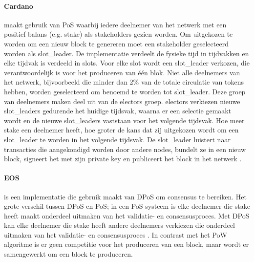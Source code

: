 \paragraph{Cardano} maakt gebruik van \acrshort{PoS} waarbij iedere deelnemer van het netwerk met een positief balans (e.g. stake) als stakeholders gezien worden. Om uitgekozen te worden om een nieuw block te genereren moet een stakeholder geselecteerd worden als \gls{slot_leader}. De implementatie verdeelt de fysieke tijd in tijdvakken en elke tijdvak is verdeeld in slots. Voor elke slot wordt een \gls{slot_leader} verkozen, die verantwoordelijk is voor het produceren van één blok. Niet alle deelnemers van het netwerk, bijvoorbeeld die minder dan 2\% van de totale circulatie van \glspl{token} hebben, worden geselecteerd om benoemd te worden tot \gls{slot_leader}. Deze groep van deelnemers maken deel uit van de \glspl{elector} groep. \Glspl{elector} verkiezen nieuwe \glspl{slot_leader} gedurende het huidige tijdsvak, waarna er een selectie gemaakt wordt en de nieuwe \glspl{slot_leader} vaststaan voor het volgende tijdsvak. Hoe meer \gls{stake} een deelnemer heeft, hoe groter de kans dat zij uitgekozen wordt om een \gls{slot_leader} te worden in het volgende tijdsvak. De \gls{slot_leader} luistert naar transacties die aangekondigd worden door andere nodes, bundelt ze in een nieuw block, signeert het met zijn private key en publiceert het block in het netwerk \citep{cardano_wiki:proof_of_stake}.

\paragraph{EOS} is een implementatie die gebruik maakt van \acrfull{DPoS} om consensus te bereiken. Het grote verschil tussen \acrshort{DPoS} en \acrshort{PoS}; in een \acrshort{PoS} systeem is elke deelnemer die \gls{stake} heeft maakt onderdeel uitmaken van het validatie- en consensusproces. Met \acrshort{DPoS} kan elke deelnemer die \gls{stake} heeft andere deelnemers verkiezen die onderdeel uitmaken van het validatie- en consensusproces \citep{steemit:eos_dpos}. In contrast met het \acrshort{PoW} algoritme is er geen competitie voor het produceren van een block, maar wordt er samengewerkt om een block te produceren.
